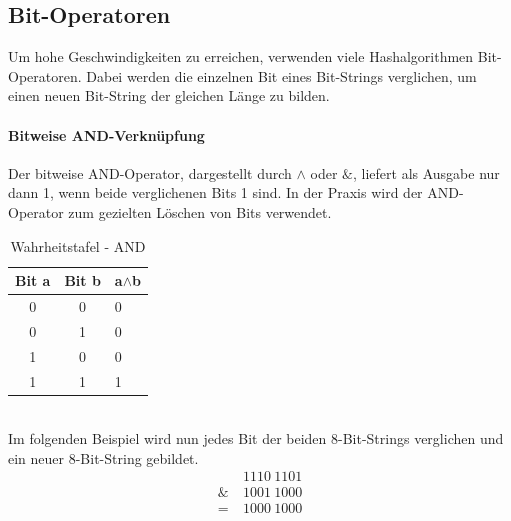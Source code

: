 \documentclass[12pt,a4paper]{scrartcl}
\numberwithin{equation}{section}
\numberwithin{myalgctr}{section}
\numberwithin{mytheoremctr}{section}
\newcommand*\BitAnd{\mathrel{\&}}
\newcommand{\mpar}[1]{\paragraph*{#1}\mbox{}\par}
\begin{document}
	\subsection{Bit-Operatoren}\label{bitoperatoren}
	Um hohe Geschwindigkeiten zu erreichen, verwenden viele Hashalgorithmen Bit-Operatoren. Dabei werden die einzelnen Bit eines Bit-Strings verglichen, um einen neuen Bit-String der gleichen Länge zu bilden. 
	\mpar{Bitweise AND-Verknüpfung}\noindent
	Der bitweise AND-Operator, dargestellt durch $\wedge$ oder $\BitAnd$, liefert als Ausgabe nur dann 1, wenn beide verglichenen Bits 1 sind. In der Praxis wird der AND-Operator zum gezielten Löschen von Bits verwendet.\\
	\begin{table}[h!]
		\centering
		\begin{tabular}{|c|c|l|}
			\hline
			\rowcolor[HTML]{C0C0C0} 
			{\color[HTML]{000000} Bit a} & {\color[HTML]{000000} Bit b} & {\color[HTML]{000000} a$\wedge$b} \\ \hline
			\rowcolor[HTML]{EFEFEF} 
			0                            & 0                            & 0                             \\ \hline
			\rowcolor[HTML]{EFEFEF} 
			0                            & 1                            & 0                             \\ \hline
			\rowcolor[HTML]{EFEFEF} 
			1                            & 0                            & 0                             \\ \hline
			\rowcolor[HTML]{EFEFEF} 
			1                            & 1                            & 1                             \\ \hline
		\end{tabular}
		\caption{Wahrheitstafel - AND}
	\end{table}\\
Im folgenden Beispiel wird nun jedes Bit der beiden 8-Bit-Strings verglichen und ein neuer 8-Bit-String gebildet.
\begin{align*}
&1110~1101\\
\BitAnd~&1001~1000\\
=~&1000~1000
\end{align*}
\end{document}
